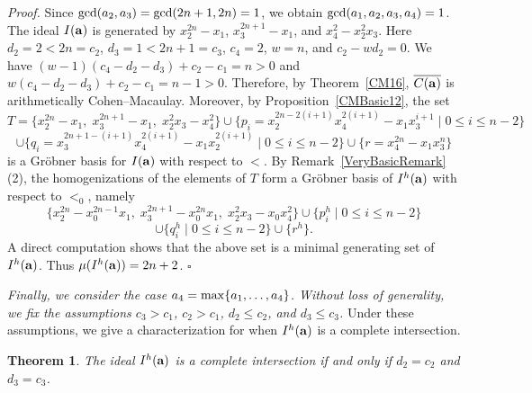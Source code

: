 \documentclass[10pt]{amsart}
\newtheorem{thm1}{Theorem}[section]
\begin{document}
{\em \noindent Proof.} Since ${\rm gcd}(a_2,a_3)={\rm gcd}(2n+1,2n)=1$, we obtain
${\rm gcd}(a_1,a_2,a_3,a_4)=1$. The ideal $I({\bf a})$ is generated by
$x_{2}^{2n}-x_1$, $x_{3}^{2n+1}-x_{1}$, and $x_{4}^{2}-x_{2}^{2}x_{3}$. Here $d_2=2<2n=c_2$, $d_3=1<2n+1=c_3$, $c_4=2$,
$w=n$, and $c_2-wd_2=0$. We have
$(w-1)(c_4-d_2-d_3)+c_2-c_1=n>0$ and
$w(c_4-d_2-d_3)+c_2-c_1=n-1>0$. Therefore, by Theorem~\ref{CM16},
$\overline{C({\bf a})}$ is arithmetically Cohen--Macaulay. Moreover, by
Proposition~\ref{CMBasic12}, the set
$$T=\{x_{2}^{2n}-x_1,\; x_{3}^{2n+1}-x_{1},\; x_{2}^{2}x_3-x_{4}^2\}
\cup \{p_{i}=x_{2}^{2n-2(i+1)}x_{4}^{2(i+1)}-x_{1}x_3^{i+1}
\mid 0 \leq i \leq n-2\}$$
$$\cup \{q_{i}=x_{3}^{2n+1-(i+1)}x_{4}^{2(i+1)}-x_{1}x_{2}^{2(i+1)}
\mid 0 \leq i \leq n-2\}
\cup \{r=x_{4}^{2n}-x_{1}x_{3}^{n}\}$$
is a Gr\"obner basis for $I({\bf a})$ with respect to $<$. By Remark~\ref{VeryBasicRemark} (2), the homogenizations of the elements of $T$
form a Gr\"obner basis of $I^{h}({\bf a})$ with respect to $<_0$, namely
$$\{x_{2}^{2n}-x_{0}^{2n-1}x_1,\; x_{3}^{2n+1}-x_{0}^{2n}x_1,\;
x_{2}^{2}x_3-x_{0}x_{4}^{2}\}
\cup \{p^{h}_{i} \mid 0 \leq i \leq n-2\}$$
$$\cup \{q^{h}_{i} \mid 0 \leq i \leq n-2\} \cup \{r^{h}\}.$$ A direct computation shows that the above set is a minimal
generating set of $I^{h}({\bf a})$. Thus $\mu(I^{h}({\bf a}))=2n+2$.
\hfill $\square$  \par\vspace{0.5\baselineskip}

{\em Finally, we consider the case $a_{4}={\rm max}\{a_1,\ldots,a_4\}$. Without loss of generality, we fix the assumptions $c_{3}>c_{1}$, $c_{2}>c_{1}$, $d_{2} \leq c_2$, and $d_{3} \leq c_3$.} Under these assumptions, we give a characterization for when $I^{h}({\bf a})$ is a complete intersection.

\begin{thm1} \label{Comp2} The ideal $I^{h}({\bf a})$ is a complete intersection if and only if $d_{2}=c_2$ and $d_{3}=c_{3}$.
\end{thm1}
\end{document}
